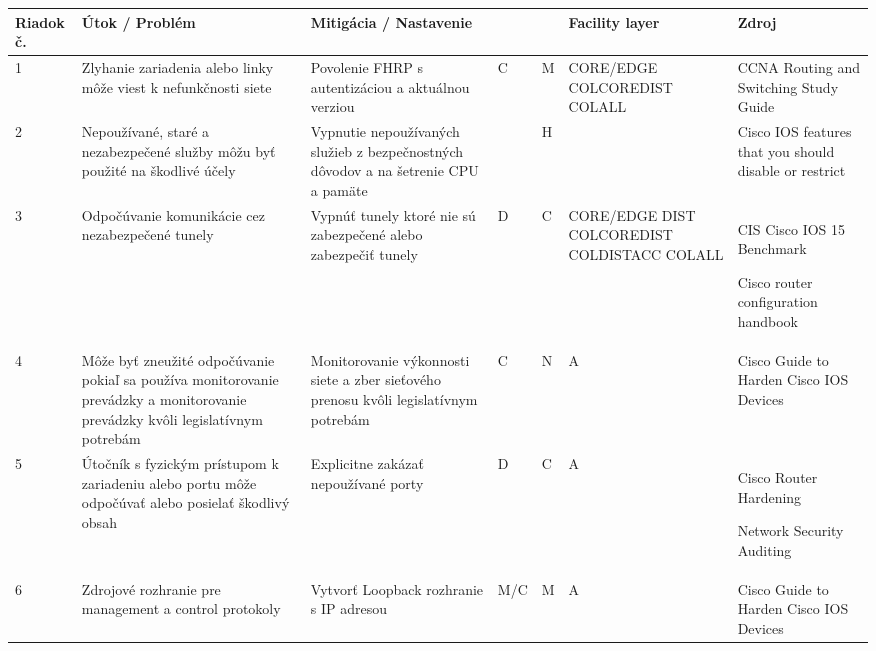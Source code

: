 \begin{longtable}[!htbp]{|C{2.5em}L{9em}L{9em}C{2em}C{2.5em}C{7.5em}L{10em}|}
	
	\hline
	\centering
	
	Riadok č.	&Útok / Problém	&Mitigácia / Nastavenie	& 	&	&Facility layer	&Zdroj\\
	\endhead
	
	 1	&Zlyhanie zariadenia alebo linky môže viest k nefunkčnosti siete 	&Povolenie FHRP s autentizáciou a aktuálnou verziou	&C	&M	&CORE/EDGE
	COLCOREDIST
	COLALL	&CCNA Routing and Switching Study Guide \cite{Lammle2013}\\
	2	&Nepoužívané, staré a nezabezpečené služby môžu byť použité na škodlivé účely	&Vypnutie nepoužívaných služieb z bezpečnostných dôvodov a na šetrenie CPU a pamäte 	& {\normalsize*}\footnotemark &H	&{\normalsize*}\footnotemark[\value{footnote}] &Cisco IOS features that you should disable or restrict \cite{yDzYjF1hoACahpg1}\\
	 3	&Odpočúvanie komunikácie  cez nezabezpečené tunely	&Vypnúť tunely ktoré nie sú zabezpečené alebo zabezpečiť tunely	&D	&C	&CORE/EDGE
	DIST
	COLCOREDIST
	COLDISTACC
	COLALL	&CIS Cisco IOS 15 Benchmark \cite{CIS_DrTLsgXv24lxeIIM}
	
	Cisco router configuration handbook \cite{Hucaby2010}\\
	4	&Môže byť zneužité odpočúvanie pokiaľ sa používa monitorovanie prevádzky a monitorovanie prevádzky kvôli legislatívnym potrebám	&Monitorovanie výkonnosti siete a zber sieťového prenosu kvôli legislatívnym potrebám	&C	&N	&A	&Cisco Guide to Harden Cisco IOS Devices \cite{Singh2018}\\
	 5	&Útočník s fyzickým prístupom k zariadeniu alebo portu môže odpočúvať alebo posielať škodlivý obsah	&Explicitne zakázať nepoužívané porty	&D	&C	&A	&Cisco Router Hardening \cite{Graesser2001}
	
	Network Security Auditing \cite{Jackson2010}\\
	6	&Zdrojové rozhranie pre management a control protokoly	&Vytvorť Loopback rozhranie s IP adresou	&M/C	&M	&A	&
	Cisco Guide to Harden Cisco IOS Devices \cite{Singh2018}
	

\end{longtable}
